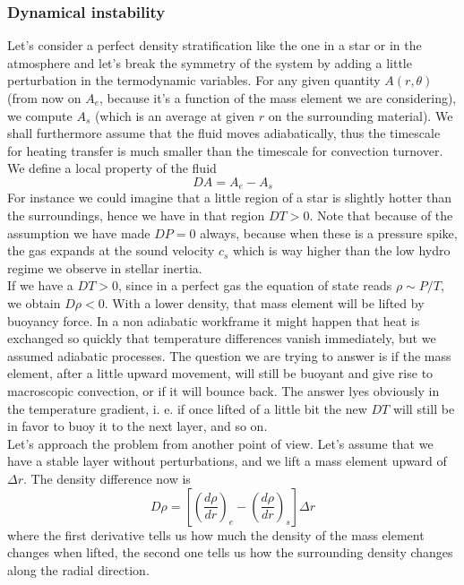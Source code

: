 \documentclass[11pt]{article}
\begin{document}
\subsubsection{Dynamical instability}
Let's consider a perfect density stratification like the one in a star or in the atmosphere and let's break the symmetry of the system by adding a little perturbation in the termodynamic variables. For any given quantity $A(r, \theta)$ (from now on $A_e$, because it's a function of the mass element we are considering), we compute $A_s$ (which is an average at given $r$ on the surrounding material). We shall furthermore assume that the fluid moves adiabatically, thus the timescale for heating transfer is much smaller than the timescale for convection turnover. \\
We define a local property of the fluid 
$$
DA=A_e - A_s
$$
For instance we could imagine that a little region of a star is slightly hotter than the surroundings, hence we have in that region $DT > 0$. Note that because of the assumption we have made $DP=0$ always, because when these is a pressure spike, the gas expands at the sound velocity $c_s$ which is way higher than the low hydro regime we observe in stellar inertia.\\
If we have a $DT>0$, since in a perfect gas the equation of state reads $\rho \sim P/T$, we obtain $D \rho < 0$. With a lower density, that mass element will be lifted by buoyancy force. In a non adiabatic workframe it might happen that heat is exchanged so quickly that temperature differences vanish immediately, but we assumed adiabatic processes. The question we are trying to answer is if the mass element, after a little upward movement, will still be buoyant and give rise to macroscopic convection, or if it will bounce back. The answer lyes obviously in the temperature gradient, i. e. if once lifted of a little bit the new $DT$ will still be in favor to buoy it to the next layer, and so on. \\
Let's approach the problem from another point of view. Let's assume that we have a stable layer without perturbations, and we lift a mass element upward of $\Delta r$. The density difference now is
\begin{equation}\label{displacment}
D \rho = \left [  \left( \frac{d \rho}{d r} \right)_e - \left( \frac{d \rho}{d r} \right)_s   \right ] \Delta r
\end{equation}
where the first derivative tells us how much the density of the mass element changes when lifted, the second one tells us how the surrounding density changes along the radial direction. \\
\end{document}
